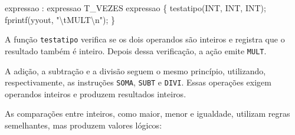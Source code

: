 \documentclass[
  brazilian,
  letterpaper,
]{book}
\newenvironment{Shaded}{\begin{snugshade}}{\end{snugshade}}
\newcommand{\NormalTok}[1]{\textcolor[rgb]{0.00,0.23,0.31}{#1}}
\newcommand{\OperatorTok}[1]{\textcolor[rgb]{0.37,0.37,0.37}{#1}}
\newcommand{\SpecialCharTok}[1]{\textcolor[rgb]{0.37,0.37,0.37}{#1}}
\newcommand{\StringTok}[1]{\textcolor[rgb]{0.13,0.47,0.30}{#1}}
\theoremstyle{plain}
\theoremstyle{definition}
\theoremstyle{remark}
\begin{document}
\begin{Shaded}
\begin{Highlighting}[]
\NormalTok{expressao}
    \OperatorTok{:}\NormalTok{ expressao T\_VEZES expressao}
        \OperatorTok{\{}
\NormalTok{            testatipo}\OperatorTok{(}\NormalTok{INT}\OperatorTok{,}\NormalTok{ INT}\OperatorTok{,}\NormalTok{ INT}\OperatorTok{);}
\NormalTok{            fprintf}\OperatorTok{(}\NormalTok{yyout}\OperatorTok{,} \StringTok{"}\SpecialCharTok{\textbackslash{}t}\StringTok{MULT}\SpecialCharTok{\textbackslash{}n}\StringTok{"}\OperatorTok{);}
        \OperatorTok{\}}
\end{Highlighting}
\end{Shaded}

A função \texttt{testatipo} verifica se os dois operandos são inteiros e
registra que o resultado também é inteiro. Depois dessa verificação, a
ação emite \texttt{MULT}.

A adição, a subtração e a divisão seguem o mesmo princípio, utilizando,
respectivamente, as instruções \texttt{SOMA}, \texttt{SUBT} e
\texttt{DIVI}. Essas operações exigem operandos inteiros e produzem
resultados inteiros.

As comparações entre inteiros, como maior, menor e igualdade, utilizam
regras semelhantes, mas produzem valores lógicos:
\end{document}

